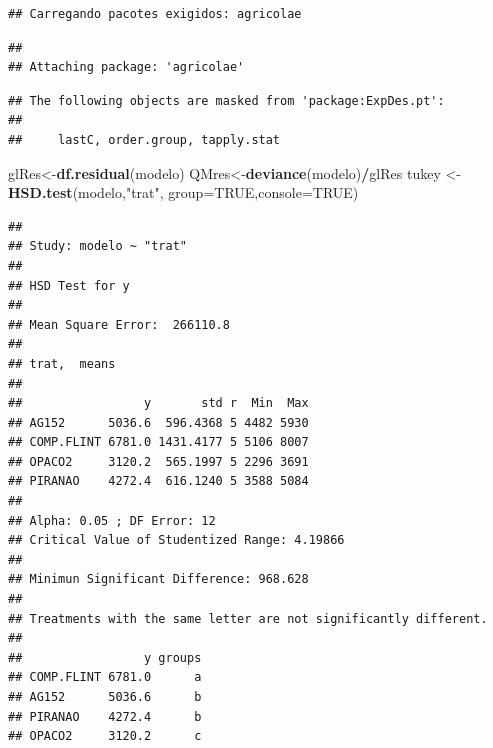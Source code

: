 \documentclass[
]{book}
\newenvironment{Shaded}{\begin{snugshade}}{\end{snugshade}}
\newcommand{\DataTypeTok}[1]{\textcolor[rgb]{0.13,0.29,0.53}{#1}}
\newcommand{\DecValTok}[1]{\textcolor[rgb]{0.00,0.00,0.81}{#1}}
\newcommand{\FloatTok}[1]{\textcolor[rgb]{0.00,0.00,0.81}{#1}}
\newcommand{\KeywordTok}[1]{\textcolor[rgb]{0.13,0.29,0.53}{\textbf{#1}}}
\newcommand{\NormalTok}[1]{#1}
\newcommand{\OperatorTok}[1]{\textcolor[rgb]{0.81,0.36,0.00}{\textbf{#1}}}
\newcommand{\OtherTok}[1]{\textcolor[rgb]{0.56,0.35,0.01}{#1}}
\newcommand{\StringTok}[1]{\textcolor[rgb]{0.31,0.60,0.02}{#1}}
\begin{document}
\begin{verbatim}
## Carregando pacotes exigidos: agricolae
\end{verbatim}

\begin{verbatim}
## 
## Attaching package: 'agricolae'
\end{verbatim}

\begin{verbatim}
## The following objects are masked from 'package:ExpDes.pt':
## 
##     lastC, order.group, tapply.stat
\end{verbatim}

\begin{Shaded}
\begin{Highlighting}[]
\NormalTok{glRes<-}\KeywordTok{df.residual}\NormalTok{(modelo)}
\NormalTok{QMres<-}\KeywordTok{deviance}\NormalTok{(modelo)}\OperatorTok{/}\NormalTok{glRes}
\NormalTok{tukey <-}\StringTok{ }\KeywordTok{HSD.test}\NormalTok{(modelo,}\StringTok{"trat"}\NormalTok{, }\DataTypeTok{group=}\OtherTok{TRUE}\NormalTok{,}\DataTypeTok{console=}\OtherTok{TRUE}\NormalTok{)}
\end{Highlighting}
\end{Shaded}

\begin{verbatim}
## 
## Study: modelo ~ "trat"
## 
## HSD Test for y 
## 
## Mean Square Error:  266110.8 
## 
## trat,  means
## 
##                 y       std r  Min  Max
## AG152      5036.6  596.4368 5 4482 5930
## COMP.FLINT 6781.0 1431.4177 5 5106 8007
## OPACO2     3120.2  565.1997 5 2296 3691
## PIRANAO    4272.4  616.1240 5 3588 5084
## 
## Alpha: 0.05 ; DF Error: 12 
## Critical Value of Studentized Range: 4.19866 
## 
## Minimun Significant Difference: 968.628 
## 
## Treatments with the same letter are not significantly different.
## 
##                 y groups
## COMP.FLINT 6781.0      a
## AG152      5036.6      b
## PIRANAO    4272.4      b
## OPACO2     3120.2      c
\end{verbatim}

\begin{Shaded}
\end{Shaded}
\end{document}
